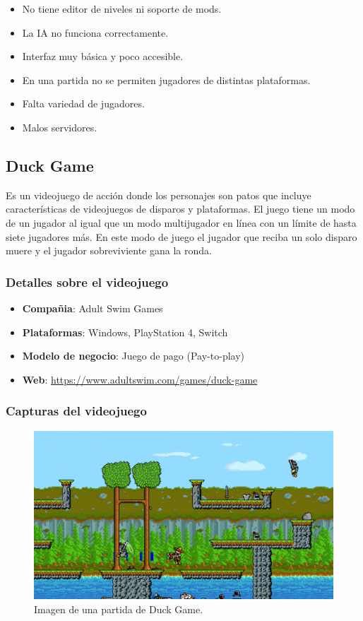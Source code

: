 \documentclass[12pt, spanish]{article}
\begin{document}
\begin{itemize}
	\item No tiene editor de niveles ni soporte de mods.
	\item La IA no funciona correctamente.
	\item Interfaz muy básica y poco accesible.
	\item En una partida no se permiten jugadores de distintas plataformas.
	\item Falta variedad de jugadores.
	\item Malos servidores.
\end{itemize}

\subsection{Duck Game}

Es un videojuego de acción donde los personajes son patos que incluye características de videojuegos de disparos y plataformas. El juego tiene un modo de un jugador al igual que un modo multijugador en línea con un límite de hasta siete jugadores más. En este modo de juego el jugador que reciba un solo disparo muere y el jugador sobreviviente gana la ronda.


\subsubsection{Detalles sobre el videojuego}

\begin{itemize}
	\item \textbf{Compañia}: Adult Swim Games
	\item \textbf{Plataformas}: Windows, PlayStation 4, Switch
	\item \textbf{Modelo de negocio}: Juego de pago (Pay-to-play)
	\item \textbf{Web}: \url{https://www.adultswim.com/games/duck-game}
\end{itemize}

\subsubsection{Capturas del videojuego}

\begin{figure}[H]
  \centering
   \includegraphics[width=\textwidth]{"competencia/dg_juego.jpg"}
	\caption{Imagen de una partida de Duck Game.}
\end{figure}
\end{document}
